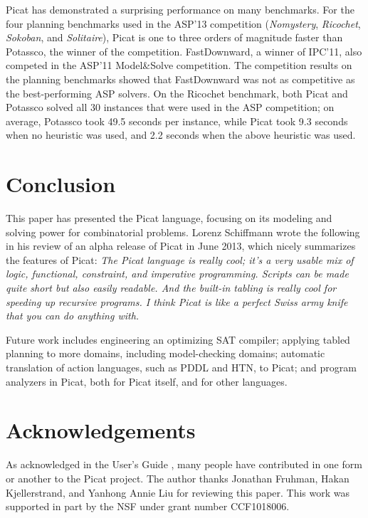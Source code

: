 \documentclass{new_tlp}
\begin{document}
Picat has demonstrated a surprising performance on many benchmarks. For the four planning benchmarks used in the ASP'13 competition ({\it Nomystery}, {\it Ricochet}, {\it Sokoban}, and {\it Solitaire}), Picat is one to three orders of magnitude faster than Potassco, the winner of the competition. FastDownward, a winner of IPC'11, also competed in the ASP'11 Model\&Solve competition. The competition results on the planning benchmarks showed that FastDownward was not as competitive as the best-performing ASP solvers. On the Ricochet benchmark, both Picat and Potassco solved all 30 instances that were used in the ASP competition; on average, Potassco took 49.5 seconds per instance, while Picat took 9.3 seconds when no heuristic was used, and 2.2 seconds when the above heuristic was used. 

\section{Conclusion}
This paper has presented the Picat language, focusing on its modeling and solving power for combinatorial problems. Lorenz Schiffmann wrote the following in his review of an alpha release of Picat in June 2013, which nicely summarizes the features of Picat: {\it The Picat language is really cool; it's a very usable mix of logic, functional, constraint, and imperative programming. Scripts can be made quite short but also easily readable. And the built-in tabling is really cool for speeding up recursive programs. I think Picat is like a perfect Swiss army knife that you can do anything with.} 

Future work includes engineering an optimizing SAT compiler; applying tabled planning to more domains, including model-checking domains; automatic translation of action languages, such as PDDL and HTN, to Picat; and program analyzers in Picat, both for Picat itself, and for other languages.

\section*{Acknowledgements}
As acknowledged in the User's Guide \cite{PicatGuide}, many people have contributed in one form or another to the Picat project. The author thanks Jonathan Fruhman, Hakan Kjellerstrand, and Yanhong Annie Liu for reviewing this paper. This work was supported in part by the NSF under grant number CCF1018006.
\end{document}
